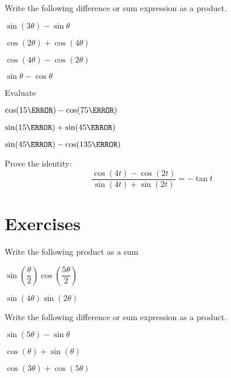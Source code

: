 \begin{example}
  Write the following difference or sum expression as a product.
  \begin{enumerate*}
    \item $\sin(3\theta)-\sin\theta$
    \item $\cos(2\theta)+\cos(4\theta)$
    \item $\cos(4\theta)-\cos(2\theta)$
    \item $\sin\theta-\cos\theta$
    \hfill\null
  \end{enumerate*}
\end{example}

\newpage

\begin{example}
  Evaluate
  \begin{enumerate*}
    \item $\cos(15\degree)-\cos(75\degree)$
    \item $\sin(15\degree)+\sin(45\degree)$
    \item $\sin(45\degree)-\cos(135\degree)$
    \hfill\null
  \end{enumerate*}
\end{example}

\begin{example}
  Prove the identity:
$$
\dfrac{\cos(4t)-\cos(2t)}{\sin(4t)+\sin(2t)}=-\tan t
$$
\end{example}

\newpage
\section*{Exercises}

\begin{exercise}
  Write the following product as a sum\\
  \begin{enumerate*}
    \item $\sin\left(\dfrac{\theta}{2}\right) \cos\left(\dfrac{5\theta}{2}\right)$
    \item $\sin\left(4\theta\right) \sin\left(2\theta\right)$\hfill\null
  \end{enumerate*}
\end{exercise}

\begin{exercise}
  Write the following difference or sum expression as a product.
  \begin{enumerate*}
    \item $\sin(5\theta)-\sin\theta$
    \item $\cos(\theta)+\sin(\theta)$
    \item $\cos(3\theta)+\cos(5\theta)$\hfill\null
  \end{enumerate*}
\end{exercise}

